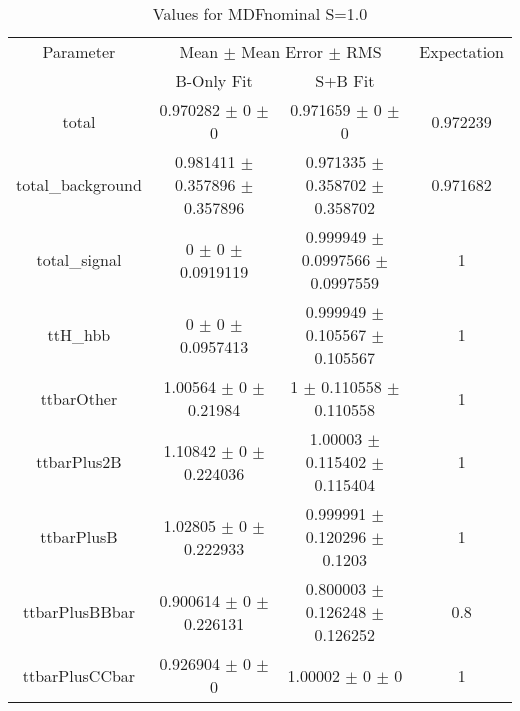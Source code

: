 \begin{table}
\centering
\caption{Values for MDFnominal S=1.0}
\begin{tabular}{cccc}
\toprule
Parameter & \multicolumn{2}{c}{Mean $\pm$ Mean Error $\pm$ RMS} & Expectation\\
 & B-Only Fit & S+B Fit & \\
\midrule
total & \num{0.970282} $\pm$ \num{0} $\pm$ \num{0} & \num{0.971659} $\pm$ \num{0} $\pm$ \num{0} & \num{0.972239}\\
total\_background & \num{0.981411} $\pm$ \num{0.357896} $\pm$ \num{0.357896} & \num{0.971335} $\pm$ \num{0.358702} $\pm$ \num{0.358702} & \num{0.971682}\\
total\_signal & \num{0} $\pm$ \num{0} $\pm$ \num{0.0919119} & \num{0.999949} $\pm$ \num{0.0997566} $\pm$ \num{0.0997559} & \num{1}\\
ttH\_hbb & \num{0} $\pm$ \num{0} $\pm$ \num{0.0957413} & \num{0.999949} $\pm$ \num{0.105567} $\pm$ \num{0.105567} & \num{1}\\
ttbarOther & \num{1.00564} $\pm$ \num{0} $\pm$ \num{0.21984} & \num{1} $\pm$ \num{0.110558} $\pm$ \num{0.110558} & \num{1}\\
ttbarPlus2B & \num{1.10842} $\pm$ \num{0} $\pm$ \num{0.224036} & \num{1.00003} $\pm$ \num{0.115402} $\pm$ \num{0.115404} & \num{1}\\
ttbarPlusB & \num{1.02805} $\pm$ \num{0} $\pm$ \num{0.222933} & \num{0.999991} $\pm$ \num{0.120296} $\pm$ \num{0.1203} & \num{1}\\
ttbarPlusBBbar & \num{0.900614} $\pm$ \num{0} $\pm$ \num{0.226131} & \num{0.800003} $\pm$ \num{0.126248} $\pm$ \num{0.126252} & \num{0.8}\\
ttbarPlusCCbar & \num{0.926904} $\pm$ \num{0} $\pm$ \num{0} & \num{1.00002} $\pm$ \num{0} $\pm$ \num{0} & \num{1}\\
\bottomrule
\end{tabular}
\end{table}